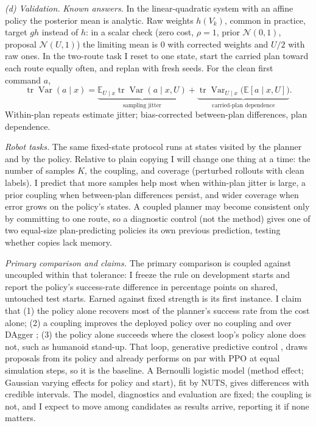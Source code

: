 \documentclass[12pt]{article}
\newcommand{\E}{\mathbb{E}}
\newcommand{\Var}{\operatorname{Var}}
\begin{document}
\textit{(d) Validation.}
\emph{Known answers.} In the linear-quadratic system with an affine policy the
posterior mean is analytic. Raw weights $h(V_k)$, common in practice, target $gh$
instead of $h$: in a scalar check (zero cost, $\rho=1$, prior $\mathcal N(0,1)$,
proposal $\mathcal N(U,1)$) the limiting mean is $0$ with corrected weights and
$U/2$ with raw ones. In the two-route task I reset to one state, start
the carried plan toward each route equally often, and replan with fresh seeds. For
the clean first command $a$,
\[
 \operatorname{tr}\Var(a\mid x)
 =\underbrace{\E_{U\mid x}\operatorname{tr}\Var(a\mid x,U)}_{\text{sampling jitter}}
 +\underbrace{\operatorname{tr}\Var_{U\mid x}\bigl(\E[a\mid x,U]\bigr)}_{\text{carried-plan dependence}} .
\]
Within-plan repeats estimate jitter; bias-corrected between-plan differences, plan dependence.

\emph{Robot tasks.} The same fixed-state protocol runs at states visited by the
planner and by the policy. Relative to plain copying I will change one thing at a
time: the number of samples $K$, the coupling, and coverage (perturbed rollouts
with clean labels). I predict that more samples help most when within-plan jitter is
large, a prior coupling when between-plan differences persist, and wider coverage
when error grows on the policy's states. A coupled planner may become consistent
only by committing to one route, so a diagnostic control (not the method) gives one
of two equal-size plan-predicting policies its own previous prediction, testing
whether copies lack memory.

\emph{Primary comparison and claims.} The primary comparison is coupled against
uncoupled within that tolerance: I freeze the rule on development starts and report
the policy's success-rate difference in percentage points on shared, untouched test
starts. Earned against fixed strength is its first instance. I claim that (1) the
policy alone recovers most of the planner's success rate from the cost alone; (2) a
coupling improves the deployed policy over no coupling and over DAgger
\citep{ross2011}; (3) the policy alone succeeds where the closest loop's policy
alone does not, such as humanoid stand-up. That loop, generative predictive control
\citep{kurtz2026}, draws proposals from its policy and already performs on par with
PPO at equal simulation steps, so it is the baseline. A Bernoulli logistic model (method effect; Gaussian varying effects
for policy and start), fit by NUTS, gives differences with credible intervals.
The model, diagnostics and evaluation are fixed; the coupling is not, and I expect
to move among candidates as results arrive, reporting it if none matters.
\end{document}
